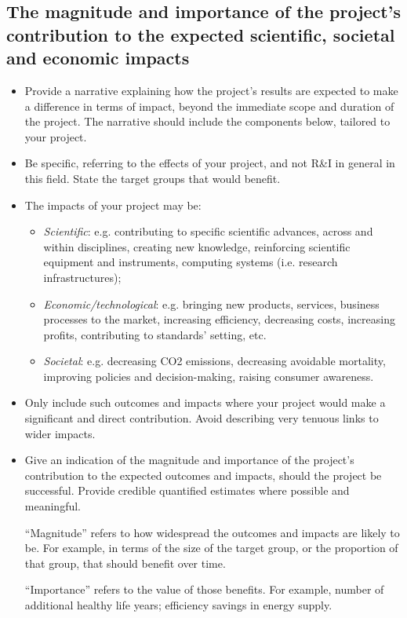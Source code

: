 \documentclass[11pt,draftproposal]{msca-pf}
\begin{document}
\subsection{The magnitude and importance of the project’s contribution to the
expected scientific, societal and economic impacts}

\begin{itemize}
    \item Provide a narrative explaining how the project’s results are expected
    to make a difference in terms of impact, beyond the immediate scope and
    duration of the project. The narrative should include the components below,
    tailored to your project.

    \item Be specific, referring to the effects of your project, and not R\&I
    in general in this field. State the target groups that would benefit.

    \item The impacts of your project may be:

    \begin{itemize}
        \item \emph{Scientific}: e.g. contributing to specific scientific advances,
        across and within disciplines, creating new knowledge, reinforcing
        scientific equipment and instruments, computing systems (i.e. research
        infrastructures);

        \item \emph{Economic/technological}: e.g. bringing new
        products, services, business processes to the market, increasing efficiency,
        decreasing costs, increasing profits, contributing to standards’ setting,
        etc.

        \item \emph{Societal}: e.g. decreasing CO2 emissions,
        decreasing avoidable mortality, improving policies and decision-making,
        raising consumer awareness.
    \end{itemize}

    \item Only include such outcomes and impacts where your project would make
    a significant and direct contribution. Avoid describing very tenuous links
    to wider impacts.

    \item Give an indication of the magnitude and importance of the project's
    contribution to the expected outcomes and impacts, should the project be
    successful. Provide credible quantified estimates where possible and meaningful.

    ``Magnitude'' refers to how widespread the outcomes and impacts are likely
    to be. For example, in terms of the size of the target group, or the
    proportion of that group, that should benefit over time.

    ``Importance'' refers to the value of those benefits. For example, number of
    additional healthy life years; efficiency savings in energy supply.
\end{itemize}
\end{document}

